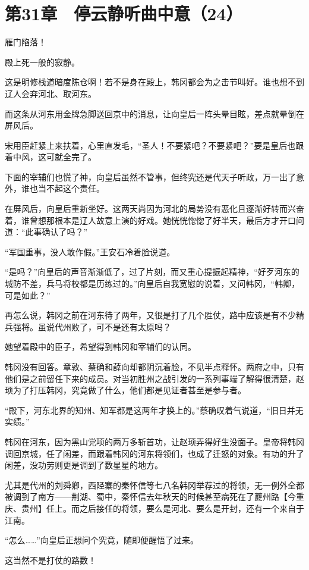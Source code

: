 \section{第31章　停云静听曲中意（24）}

雁门陷落！

殿上死一般的寂静。

这是明修栈道暗度陈仓啊！若不是身在殿上，韩冈都会为之击节叫好。谁也想不到辽人会弃河北、取河东。

而这条从河东用金牌急脚送回京中的消息，让向皇后一阵头晕目眩，差点就晕倒在屏风后。

宋用臣赶紧上来扶着，心里直发毛，“圣人！不要紧吧？不要紧吧？”要是皇后也跟着中风，这可就全完了。

下面的宰辅们也慌了神，向皇后虽然不管事，但终究还是代天子听政，万一出了意外，谁也当不起这个责任。

在屏风后，向皇后重新坐好。这两天尚因为河北的局势没有恶化且逐渐好转而兴奋着，谁曾想那根本是辽人故意上演的好戏。她恍恍惚惚了好半天，最后方才开口问道：“此事确认了吗？”

“军国重事，没人敢作假。”王安石冷着脸说道。

“是吗？”向皇后的声音渐渐低了，过了片刻，而又重心提振起精神，“好歹河东的城防不差，兵马将校都是历练过的。”向皇后自我宽慰的说着，又问韩冈，“韩卿，可是如此？”

再怎么说，韩冈之前在河东待了两年，又很是打了几个胜仗，路中应该是有不少精兵强将。虽说代州败了，可不是还有太原吗？

她望着殿中的臣子，希望得到韩冈和宰辅们的认同。

韩冈没有回答。章敦、蔡确和薛向却都阴沉着脸，不见半点释怀。两府之中，只有他们是之前留任下来的成员。对当初胜州之战引发的一系列事端了解得很清楚，赵顼为了打压韩冈，究竟做了什么，他们都是见证者甚至是参与者。

“殿下，河东北界的知州、知军都是这两年才换上的。”蔡确叹着气说道，“旧日并无实绩。”

韩冈在河东，因为黑山党项的两万多斩首功，让赵顼弄得好生没面子。皇帝将韩冈调回京城，任了闲差，而跟着韩冈的河东将领们，也成了迁怒的对象。有功的升了闲差，没功劳则更是调到了数星星的地方。

尤其是代州的刘舜卿，西陉寨的秦怀信等七八名韩冈举荐过的将领，无一例外全都被调到了南方——荆湖、蜀中，秦怀信去年秋天的时候甚至病死在了夔州路【今重庆、贵州】任上。而之后接任的将领，要么是河北、要么是开封，还有一个来自于江南。

“怎么……”向皇后正想问个究竟，随即便醒悟了过来。

这当然不是打仗的路数！


